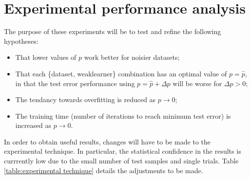\section{Experimental performance analysis}

The purpose of these experiments will be to test and refine the
following hypotheses:

\begin{itemize}
\item	That lower values of $p$ work better for noisier datasets;
\item	That each \{dataset, weaklearner\} combination has an optimal
	value of $p = \hat{p}$, in that the test error performance using
	$p = \hat{p} + \Delta p$ will be worse for $\Delta p > 0$;
\item	The tendancy towards overfitting is reduced as $p \rightarrow
	0$;
\item	The training time (number of iterations to reach minimum test
	error) is increased as $p \rightarrow 0$.
\end{itemize}

In order to obtain useful results, changes will have to be made to the
experimental technique.  In particular, the statistical confidence in
the results is currrently low due to the small number of test samples
and single trials.
Table \ref{table:experimental technique} details the adjustments to be
made.

\newcommand{\trialfn}{\footnote{Number of independent trials to be
statistically averaged}}
\newcommand{\sourcefn}{\footnote{``Toy'' datasets are generated from a
simple distribution; ``real'' are from (for example) the UC Irvine
repository \cite{UCI}.}}

